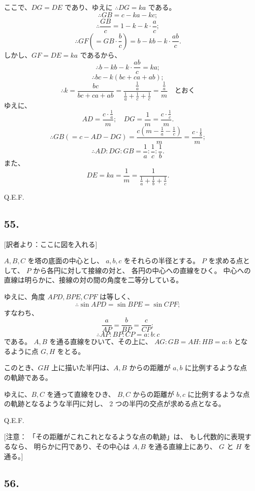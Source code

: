 ここで、$DG = DE$ であり、ゆえに $\therefore DG = ka$ である。
\[
\therefore
GB = c - ka - kc;
\]
\[
\therefore
\frac{GB}{c} = 1 - k - k \cdot \frac{a}{c};
\]
\[
\therefore
GF \left( = GB \cdot \frac{b}{c} \right) = b - kb - k \cdot \frac{ab}{c}.
\]
しかし、$GF = DE = ka$ であるから、
\[
\therefore
b - kb - k \cdot \frac{ab}{c} = ka;
\]
\[
\therefore
bc - k(bc + ca + ab);
\]
\[
\therefore
k = \frac{bc}{bc + ca + ab}
 = \frac{\frac{1}{a}}{\frac{1}{a} + \frac{1}{c} + \frac{1}{c}}
 = \frac{\frac{1}{a}}{m}
 \quad \mbox{とおく}
\]
ゆえに、
\[
AD = \frac{c \cdot \frac{1}{a}}{m};
\quad
DG = \frac{1}{m} = \frac{c \cdot \frac{1}{c}}{m}.
\]
\[
\therefore
GB ( = c - AD - DG)
 = \frac{c \left( m - \frac{1}{a} - \frac{1}{c} \right)}{m}
  = \frac{c \cdot \frac{1}{b}}{m};
\]
\[
\therefore
AD : DG : GB = \frac{1}{a} : \frac{1}{c} : \frac{1}{b}.
\]
また、
\[
DE = ka = \frac{1}{m} = \frac{1}{\frac{1}{a} + \frac{1}{b} + \frac{1}{c}}.
\]

Q.E.F.


\subsection*{55.}

[訳者より：ここに図を入れる] 

$A, B, C$ を塔の底面の中心とし、
$a, b, c$ をそれらの半径とする。
$P$ を求める点として、
$P$ から各円に対して接線の対と、
各円の中心への直線をひく。
中心への直線は明らかに、接線の対の間の角度を二等分している。

ゆえに、角度 $APD, BPE, CPF$ は等しく、
\[
\therefore
\sin APD = \sin BPE = \sin CPF;
\]
すなわち、
\[
\frac{a}{AP} = \frac{b}{BP} = \frac{c}{CP};
\]
\[
\therefore
AP : BP : CP = a : b : c
\]
である。
$A, B$ を通る直線をひいて、その上に、
$AG : GB = AH : HB = a : b$ となるように点 $G, H$ をとる。

このとき、$GH$ 上に描いた半円は、$A, B$ からの距離が $a, b$
に比例するような点の軌跡である。

ゆえに、$B, C$ を通って直線をひき、
$B, C$ からの距離が $b, c$ に比例するような点の軌跡となるような半円に対し、
 2 つの半円の交点が求める点となる。

Q.E.F.

[注意：
「その距離がこれこれとなるような点の軌跡」は、
もし代数的に表現するなら、
明らかに円であり、その中心は $A, B$ を通る直線上にあり、
$G$ と $H$ を通る。]


\subsection*{56.}

